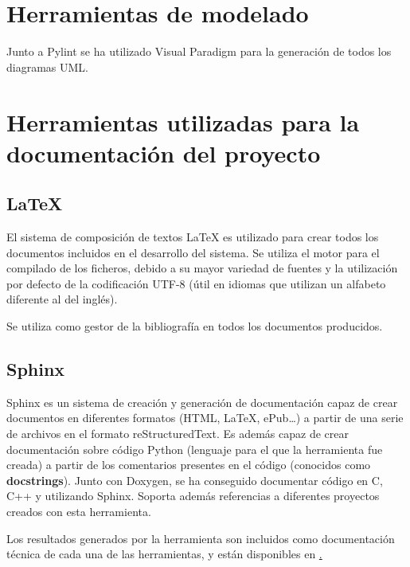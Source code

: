 \section{Herramientas de modelado}

Junto a Pylint se ha utilizado Visual Paradigm para la generación de todos los diagramas UML.

\section{Herramientas utilizadas para la documentación del proyecto}

\subsection{{\LaTeX}}

El sistema de composición de textos {\LaTeX} es utilizado para crear todos los documentos incluidos en el desarrollo del sistema. Se utiliza el motor {\XeLaTeX} para el compilado de los ficheros, debido a su mayor variedad de fuentes y la utilización por defecto de la codificación UTF-8 (útil en idiomas que utilizan un alfabeto diferente al del inglés). 

Se utiliza {\BibTeX} como gestor de la bibliografía en todos los documentos producidos.

\subsection{Sphinx}

Sphinx es un sistema de creación y generación de documentación capaz de crear documentos en diferentes formatos (HTML, \LaTeX, ePub\dots) a partir de una serie de archivos en el formato reStructuredText. Es además capaz de crear documentación sobre código Python (lenguaje para el que la herramienta fue creada) a partir de los comentarios presentes en el código (conocidos como \textbf{docstrings}). Junto con Doxygen, se ha conseguido documentar código en C, C++ y %
utilizando Sphinx. Soporta además referencias a diferentes proyectos creados con esta herramienta.

Los resultados generados por la herramienta son incluidos como documentación técnica de cada una de las herramientas, y están disponibles en \href{marcopolo.martinarroyo.net}.



